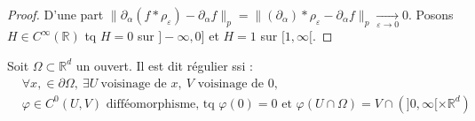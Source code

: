 \begin{proof}
    D'une part $\|\partial_\alpha \left( f*\rho_\varepsilon  \right) -\partial_\alpha f\|_p=\|\left( \partial_\alpha  \right) *\rho_\varepsilon -\partial_\alpha f\|_p \underset{\varepsilon \to 0}{\longrightarrow} 0.$ Posons $H\in  C^\infty (\mathbb{R} )$ tq $H=0$ sur $]-\infty ,0]$ et $H=1$ sur $[1,\infty [.$
\end{proof}

\begin{definition}
    Soit $\Omega\subset \mathbb{R} ^d$ un ouvert. Il est dit régulier ssi :
    \begin{align*}
        &\forall x,\in \partial\Omega,\ \exists U\ \text{voisinage de }x,~ V\text{ voisinage de }0,\\
        &\varphi \in C^0(U,V) \text{ difféomorphisme, tq }\varphi (0)=0 \text{ et } \varphi (U\cap \Omega)=V\cap \left( ]0,\infty [\times \mathbb{R} ^d \right) 
    \end{align*}
\end{definition}

